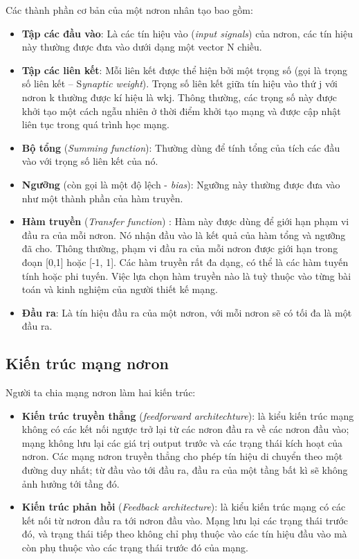 Các thành phần cơ bản của một nơron nhân tạo bao gồm: 
\begin{itemize}
\item \textbf{Tập các đầu vào}: Là các tín hiệu vào (\textit{input signals}) của nơron, các tín hiệu này thường được đưa vào dưới dạng một vector N chiều. 
\item \textbf{Tập các liên kết}: Mỗi liên kết được thể hiện bởi một trọng số (gọi là trọng số liên kết – S\textit{ynaptic weight}). Trọng số liên kết giữa tín hiệu vào thứ j với nơron k thường được kí hiệu là wkj. Thông thường, các trọng số này được khởi tạo một cách ngẫu nhiên ở thời điểm khởi tạo mạng và được cập nhật liên tục trong quá trình học mạng. 
\item \textbf{Bộ tổng} (\textit{Summing function}): Thường dùng để tính tổng của tích các đầu vào với trọng số liên kết của nó. 
\item \textbf{Ngưỡng} (còn gọi là một độ lệch - \textit{bias}): Ngưỡng này thường được đưa vào như một thành phần của hàm truyền. 
\item \textbf{Hàm truyền} (\textit{Transfer function}) : Hàm này được dùng để giới hạn phạm vi đầu ra của mỗi nơron. Nó nhận đầu vào là kết quả của hàm tổng và ngưỡng đã cho. Thông thường, phạm vi đầu ra của mỗi nơron được giới hạn trong đoạn [0,1] hoặc [-1, 1]. Các hàm truyền rất đa dạng, có thể là các hàm tuyến tính hoặc phi tuyến. Việc lựa chọn hàm truyền nào là tuỳ thuộc vào từng bài toán và kinh nghiệm của người thiết kế mạng.
\item \textbf{Đầu ra}: Là tín hiệu đầu ra của một nơron, với mỗi nơron sẽ có tối đa là một đầu ra. 
\end{itemize}

\subsection{Kiến trúc mạng nơron}
Người ta chia mạng nơron làm hai kiến trúc: 
\begin{itemize}

\item \textbf{Kiến trúc truyền thẳng} (\textit{feedforward architechture}): là kiểu kiến trúc mạng không có các kết nối ngược trở lại từ các nơron đầu ra về các nơron đầu vào; mạng không lưu lại các giá trị output trước và các trạng thái kích hoạt của nơron. Các mạng nơron truyền thẳng cho phép tín hiệu di chuyển theo một đường duy nhất; từ đầu vào tới đầu ra, đầu ra của một tầng bất kì sẽ không ảnh hưởng tới tầng đó.
\item \textbf{Kiến trúc phản hồi} (\textit{Feedback architecture}): là kiểu kiến trúc mạng có các kết nối từ nơron đầu ra tới nơron đầu vào. Mạng lưu lại các trạng thái trước đó, và trạng thái tiếp theo không chỉ phụ thuộc vào các tín hiệu đầu vào mà còn phụ thuộc vào các trạng thái trước đó của mạng.
\end{itemize}